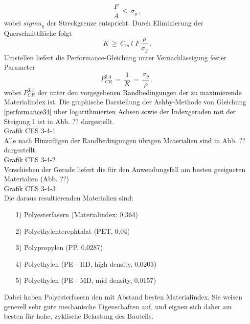 \begin{equation}
	\frac{F}{A}\,\le\,\sigma_y\,,
\end{equation}
wobei $sigma_y$ der Streckgrenze entspricht.
Durch Eliminierung der Querschnittfläche folgt
\begin{equation}
K\,\ge\,C_m\,l\,\,F\,\frac{\rho}{\sigma_y}\,.
\end{equation}
Umstellen liefert die Performance-Gleichung unter Vernachlässigung fester Parameter
\begin{equation}\label{performance34}
P_{CR}^{3.4}\,=\,\frac{1}{K}\,=\,\frac{\sigma_y}{\rho}\,,
\end{equation}
wobei $P_{CR}^{3.4}$ der unter den vorgegebenen Randbedingungen der zu maximierende Materialindex ist. Die graphische Darstellung der Ashby-Methode von Gleichung \ref{performance34} über logarithmierten Achsen sowie der Indexgeraden mit der Steigung 1 ist in Abb. ?? dargestellt.\\
Grafik CES 3-4-1\\
Alle nach Hinzufügen der Randbedingungen übrigen Materialien sind in Abb. ?? dargestellt.\\
Grafik CES 3-4-2\\
Verschieben der Gerade liefert die für den Anwendungsfall am besten geeigneten Materialien (Abb. ??)\\
Grafik CES 3-4-3\\
Die daraus resultierenden Materialien sind:
\begin{itemize}
	\item[1)] Polyesterfasern (Materialindex: 0,364)
	\item[2)] Polyethylenterephtalat (PET, 0,04) 
	\item[3)] Polypropylen (PP, 0,0287)
	\item[4)] Polyethylen (PE - HD, high density, 0,0203)
	\item[5)] Polyethylen (PE - MD, mid density, 0,0157)
\end{itemize}
Dabei haben Polyesterfasern den mit Abstand besten Materialindex. Sie weisen generell sehr gute mechanische Eigenschaften auf, und eignen sich daher am besten für hohe, zyklische Belastung des Bauteils.